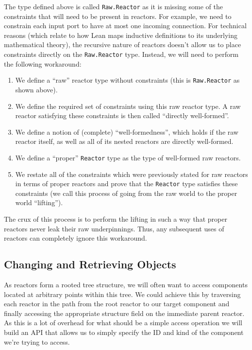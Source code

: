 The type defined above is called \lstinline{Raw.Reactor} as it is missing some of the constraints that will need to be present in reactors.
For example, we need to constrain each input port to have at most one incoming connection.
For technical reasons (which relate to how Lean maps inductive definitions to its underlying mathematical theory), the recursive nature of reactors doesn't allow us to place constraints directly on the \lstinline{Raw.Reactor} type.
Instead, we will need to perform the following workaround:

\begin{enumerate}
    \item We define a ``raw'' reactor type without constraints (this is \lstinline{Raw.Reactor} as shown above).
    \item We define the required set of constraints using this raw reactor type. A raw reactor satisfying these constraints is then called ``directly well-formed''.
    \item We define a notion of (complete) ``well-formedness'', which holds if the raw reactor itself, as well as all of its nested reactors are directly well-formed.
    \item We define a ``proper'' \lstinline{Reactor} type as the type of well-formed raw reactors.
    \item We restate all of the constraints which were previously stated for raw reactors in terms of proper reactors and prove that the \lstinline{Reactor} type satisfies these constraints (we call this process of going from the raw world to the proper world ``lifting'').
\end{enumerate}

The crux of this process is to perform the lifting in such a way that proper reactors never leak their raw underpinnings.
Thus, any subsequent uses of reactors can completely ignore this workaround.

\subsection{Changing and Retrieving Objects}

As reactors form a rooted tree structure, we will often want to access components located at arbitrary points within this tree.
We could achieve this by traversing each reactor in the path from the root reactor to our target component and finally accessing the appropriate structure field on the immediate parent reactor. 
As this is a lot of overhead for what should be a simple access operation we will build an API that allows us to simply specify the ID and kind of the component we're trying to access.

